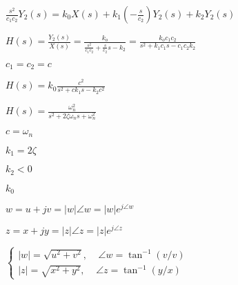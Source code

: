 \documentclass{article}
\def\lthtmlcheckvsize{\ifdim\ht\sizebox<\vsize 
  \ifdim\wd\sizebox<\hsize\expandafter\hfill\fi \expandafter\vfill
  \else\expandafter\vss\fi}%
\begin{document}
{\newpage\clearpage
{}%
$\displaystyle \frac{s^2}{c_1c_2} Y_2(s)=k_0X(s)+k_1(-\frac{s}{c_2})Y_2(s)+k_2Y_2(s) $%
\lthtmlindisplaymathZ
\lthtmlcheckvsize\clearpage}

{\newpage\clearpage
{}%
$\displaystyle H(s)=\frac{Y_2(s)}{X(s)}=\frac{k_o}{\frac{s^2}{c_1c_2}+\frac{s}{c_2}s-k_2}
	=\frac{k_oc_1c_2}{s^2+k_1c_1s-c_1c_2k_2}
$%
\lthtmlindisplaymathZ
\lthtmlcheckvsize\clearpage}

{\newpage\clearpage
{}%
$c_1=c_2=c$%
\lthtmlindisplaymathZ
\lthtmlcheckvsize\clearpage}

{\newpage\clearpage
{}%
$\displaystyle H(s)=k_0\frac{c^2}{s^2+c k_1s-k_2c^2}
$%
\lthtmlindisplaymathZ
\lthtmlcheckvsize\clearpage}

{\newpage\clearpage
{}%
$\displaystyle H(s)=\frac{\omega_n^2}{s^2+2\zeta \omega_n s+\omega_n^2}
$%
\lthtmlindisplaymathZ
\lthtmlcheckvsize\clearpage}

{\newpage\clearpage
{}%
$c=\omega_n$%
\lthtmlindisplaymathZ
\lthtmlcheckvsize\clearpage}

{\newpage\clearpage
{}%
$k_1=2\zeta$%
\lthtmlindisplaymathZ
\lthtmlcheckvsize\clearpage}

{\newpage\clearpage
{}%
$k_2<0$%
\lthtmlindisplaymathZ
\lthtmlcheckvsize\clearpage}

{\newpage\clearpage
{}%
$k_0$%
\lthtmlindisplaymathZ
\lthtmlcheckvsize\clearpage}

{\newpage\clearpage
{}%
$w=u+jv=|w|\angle w=|w|e^{j\angle w}$%
\lthtmlindisplaymathZ
\lthtmlcheckvsize\clearpage}

{\newpage\clearpage
{}%
$z=x+jy=|z|\angle z=|z|e^{j\angle z}$%
\lthtmlindisplaymathZ
\lthtmlcheckvsize\clearpage}

{\newpage\clearpage
{}%
$\displaystyle \left\{ \begin{array}{l}
      |w|=\sqrt{u^2+v^2},\;\;\;\;\angle w=\tan^{-1}\left( v/v \right) \\
      |z|=\sqrt{x^2+y^2},\;\;\;\;\angle z=\tan^{-1}\left( y/x \right) \end{array} \right. $%
\lthtmlindisplaymathZ
\lthtmlcheckvsize\clearpage}
\end{document}
